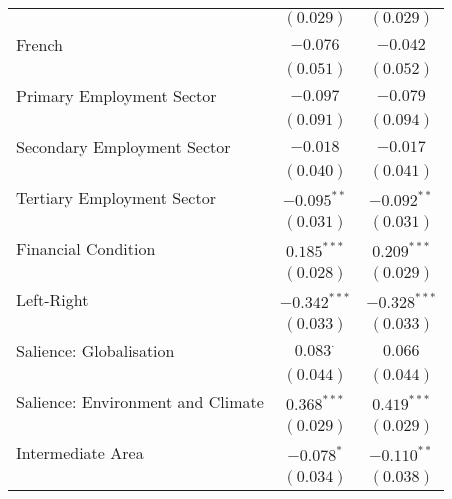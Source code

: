 \begin{center}
\begin{tiny}
\begin{longtable}{l@{} c@{} c@{}}
                                                          & $(0.029)$        & $(0.029)$        \\
\quad French                                              & $-0.076$         & $-0.042$         \\
                                                          & $(0.051)$        & $(0.052)$        \\
\quad Primary Employment Sector                           & $-0.097$         & $-0.079$         \\
                                                          & $(0.091)$        & $(0.094)$        \\
\quad Secondary Employment Sector                         & $-0.018$         & $-0.017$         \\
                                                          & $(0.040)$        & $(0.041)$        \\
\quad Tertiary Employment Sector                          & $-0.095^{**}$    & $-0.092^{**}$    \\
                                                          & $(0.031)$        & $(0.031)$        \\
\quad Financial Condition                                 & $0.185^{***}$    & $0.209^{***}$    \\
                                                          & $(0.028)$        & $(0.029)$        \\
\quad Left-Right                                          & $-0.342^{***}$   & $-0.328^{***}$   \\
                                                          & $(0.033)$        & $(0.033)$        \\
\quad Salience: Globalisation                             & $0.083^{\cdot}$  & $0.066$          \\
                                                          & $(0.044)$        & $(0.044)$        \\
\quad Salience: Environment and Climate                   & $0.368^{***}$    & $0.419^{***}$    \\
                                                          & $(0.029)$        & $(0.029)$        \\
Intermediate Area                                         & $-0.078^{*}$     & $-0.110^{**}$    \\
                                                          & $(0.034)$        & $(0.038)$        \\

\end{longtable}
\end{tiny}
\end{center}
